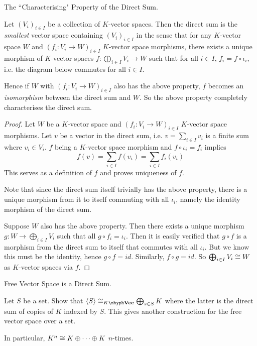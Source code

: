 \documentclass[../../book.tex]{subfiles}
\begin{document}
\begin{thm} The ``Characterising" Property of the Direct Sum.
    
    Let $(V_i)_{i\in I}$ be a collection of $K$-vector spaces.
    Then the direct sum is the \emph{smallest} vector space 
    containing $(V_i)_{i\in I}$ in the sense that
    for any $K$-vector space $W$ and 
    $(f_i : V_i \to W)_{i\in I}$ $K$-vector space morphisms,
    there exists a unique morphism of $K$-vector spaces 
    $f : \bigoplus_{i\in I} V_i \to W$ such that for all $i\in I$, 
    $f_i = f \circ \iota_i$,
    i.e. the diagram below commutes for all $i \in I$.  
    \begin{figure} [ht]
        \centering
    \end{figure}

    
    Hence if $W$ with $(f_i : V_i \to W)_{i\in I}$ also has the above property,
    $f$ becomes an \emph{isomorphism} between the direct sum and $W$.
    So the above property completely characterises the direct sum. 
\end{thm}
\begin{proof}
    Let $W$ be a $K$-vector space and 
    $(f_i : V_i \to W)_{i\in I}$ $K$-vector space morphisms.
    Let $v$ be a vector in the direct sum, 
    i.e. $v = \sum_{i\in I} v_i$ is a finite sum where $v_i \in V_i$. 
    $f$ being a $K$-vector space morphism and $f \circ \iota_i = f_i$ implies \[
        f(v) = \sum_{i\in I} f(v_i) = \sum_{i\in I} f_i(v_i)
    \]
    This serves as a definition of $f$ and proves uniqueness of $f$. 
    
    Note that since the direct sum itself trivially has the above property, 
    there is a unique morphism from it to itself commuting with all $\iota_i$,
    namely the identity morphism of the direct sum. 
    
    Suppose $W$ also has the above property. 
    Then there exists a unique morphism $g : W \to \bigoplus_{i\in I} V_i$
    such that all $g \circ f_i = \iota_i$. 
    Then it is easily verified that $g \circ f$ is a morphism 
    from the direct sum to itself that commutes with all $\iota_i$.
    But we know this must be the identity, hence $g \circ f = id$. 
    Similarly, $f \circ g = id$. 
    So $\bigoplus_{i\in I} V_i \cong W$ as $K$-vector spaces via $f$. 
\end{proof}
\begin{ex} Free Vector Space is a Direct Sum.
    
    Let $S$ be a set. 
    Show that $\<S\> \iso_{\KVec} \bigoplus_{s\in S} K$ where the latter is
    the direct sum of copies of $K$ indexed by $S$. 
    This gives another construction for the free vector space over a set. 
    
    In particular, $K^n \cong K \oplus \cdots \oplus K$ $n$-times. 
\end{ex}
\end{document}
